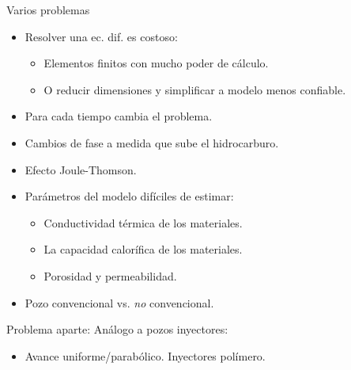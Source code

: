 \documentclass[presentation]{beamer}
\begin{document}
\begin{frame}{Varios problemas}
	\begin{itemize}
		\item Resolver una ec. dif. es costoso:
		\begin{itemize}
			\item Elementos finitos con mucho poder de cálculo.
			\item O reducir dimensiones y simplificar a modelo menos confiable.
		\end{itemize}
		\item Para cada tiempo cambia el problema.
		\item Cambios de fase a medida que sube el hidrocarburo.
		\item Efecto Joule-Thomson.
		\item Parámetros del modelo difíciles de estimar:
		\begin{itemize}
			\item Conductividad térmica de los materiales.
			\item La capacidad calorífica de los materiales.
			\item Porosidad y permeabilidad.
		\end{itemize}
		\item Pozo convencional vs. \emph{no} convencional.
	\end{itemize}
\begin{block}{Problema aparte:}
	Análogo a pozos inyectores:
	\begin{itemize}
		\item Avance uniforme/parabólico. Inyectores polímero.
	\end{itemize}
\end{block}
\end{frame}
\end{document}
